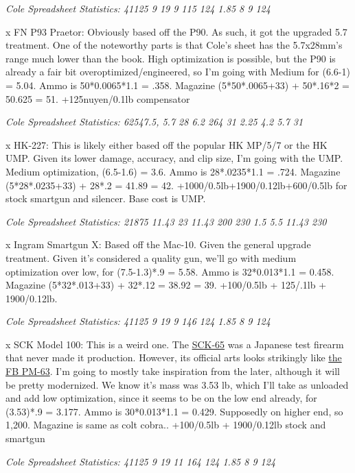 \begin{multicols*}{2}
	\textit{\textcolor{OliveGreen}{Cole Spreadsheet Statistics: 41125 9 19 9 115 124 1.85 8 9 124 }}
	
	x FN P93 Praetor: Obviously based off the P90. As such, it got the upgraded 5.7 treatment. One of the noteworthy parts is that Cole's sheet has the 5.7x28mm's range much lower than the book. High optimization is possible, but the P90 is already a fair bit overoptimized/engineered, so I'm going with Medium for (6.6-1) = 5.04. Ammo is 50*0.0065*1.1 = .358. Magazine (5*50*.0065+33) + 50*.16*2 = 50.625 = 51. +125nuyen/0.1lb compensator
	
	\textit{\textcolor{OliveGreen}{Cole Spreadsheet Statistics:  62547.5, 5.7 28 6.2 264 31 2.25 4.2 5.7 31}}
	
	x HK-227: This is likely either based off the popular HK MP/5/7 or the HK UMP. Given its lower damage, accuracy, and clip size, I'm going with the UMP. Medium optimization, (6.5-1.6) = 3.6. Ammo is 28*.0235*1.1 = .724. Magazine (5*28*.0235+33) + 28*.2 = 41.89 = 42. +1000/0.5lb+1900/0.12lb+600/0.5lb for stock smartgun and silencer. Base cost is UMP.
	
	\textit{\textcolor{OliveGreen}{Cole Spreadsheet Statistics: 21875 11.43 23 11.43 200 230 1.5 5.5 11.43 230}}
	
	x Ingram Smartgun X: Based off the Mac-10. Given the general upgrade treatment. Given it's considered a quality gun, we'll go with medium optimization over low, for (7.5-1.3)*.9 = 5.58. Ammo is 32*0.013*1.1 = 0.458. Magazine (5*32*.013+33) + 32*.12 = 38.92 = 39. +100/0.5lb + 125/.1lb + 1900/0.12lb.
	
	\textit{\textcolor{OliveGreen}{Cole Spreadsheet Statistics: 41125 9 19 9 146 124 1.85 8 9 124}}
	
	x SCK Model 100: This is a weird one. The \textcolor{Blue}{\href{https://en.wikipedia.org/wiki/New_Nambu_M66}{SCK-65}} was a Japanese test firearm that never made it production. However, its official arts looks strikingly like \textcolor{Blue}{\href{https://en.wikipedia.org/wiki/FB_PM-63}{the FB PM-63}}. I'm going to mostly take inspiration from the later, although it will be pretty modernized. We know it's mass was 3.53 lb, which I'll take as unloaded and add low optimization, since it seems to be on the low end already, for (3.53)*.9 = 3.177. Ammo is 30*0.013*1.1 = 0.429. Supposedly on higher end, so 1,200. Magazine is same as colt cobra.. +100/0.5lb + 1900/0.12lb stock and smartgun
	
	\textit{\textcolor{OliveGreen}{Cole Spreadsheet Statistics: 41125 9 19 11 164 124 1.85 8 9 124}}
	

\end{multicols*}
